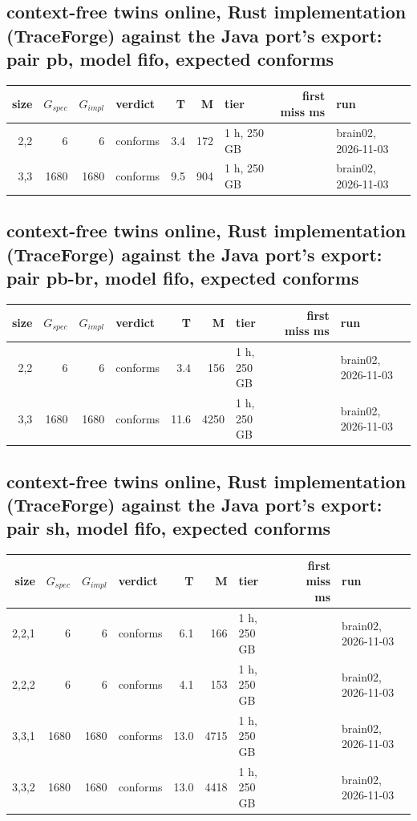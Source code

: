 \documentclass[10pt]{article}
\begin{document}
\subsection*{context-free twins online, Rust implementation (TraceForge) against the Java port's export: pair \textsf{pb}, model fifo, expected conforms}
\begin{longtable}{@{}rrrlrrlrl@{}}
\toprule
size & $G_{\mathit{spec}}$ & $G_{\mathit{impl}}$ & verdict & T & M & tier & first miss ms & run \\
\midrule
\endhead
\color{red} 2,2 & 6 & 6 & conforms & 3.4 & 172 & 1 h, 250 GB &  & brain02, 2026-11-03 \\
\color{red} 3,3 & 1680 & 1680 & conforms & 9.5 & 904 & 1 h, 250 GB &  & brain02, 2026-11-03 \\
\bottomrule
\end{longtable}
\subsection*{context-free twins online, Rust implementation (TraceForge) against the Java port's export: pair \textsf{pb-br}, model fifo, expected conforms}
\begin{longtable}{@{}rrrlrrlrl@{}}
\toprule
size & $G_{\mathit{spec}}$ & $G_{\mathit{impl}}$ & verdict & T & M & tier & first miss ms & run \\
\midrule
\endhead
\color{red} 2,2 & 6 & 6 & conforms & 3.4 & 156 & 1 h, 250 GB &  & brain02, 2026-11-03 \\
\color{red} 3,3 & 1680 & 1680 & conforms & 11.6 & 4250 & 1 h, 250 GB &  & brain02, 2026-11-03 \\
\bottomrule
\end{longtable}
\subsection*{context-free twins online, Rust implementation (TraceForge) against the Java port's export: pair \textsf{sh}, model fifo, expected conforms}
\begin{longtable}{@{}rrrlrrlrl@{}}
\toprule
size & $G_{\mathit{spec}}$ & $G_{\mathit{impl}}$ & verdict & T & M & tier & first miss ms & run \\
\midrule
\endhead
\color{red} 2,2,1 & 6 & 6 & conforms & 6.1 & 166 & 1 h, 250 GB &  & brain02, 2026-11-03 \\
\color{red} 2,2,2 & 6 & 6 & conforms & 4.1 & 153 & 1 h, 250 GB &  & brain02, 2026-11-03 \\
\color{red} 3,3,1 & 1680 & 1680 & conforms & 13.0 & 4715 & 1 h, 250 GB &  & brain02, 2026-11-03 \\
\color{red} 3,3,2 & 1680 & 1680 & conforms & 13.0 & 4418 & 1 h, 250 GB &  & brain02, 2026-11-03 \\
\bottomrule
\end{longtable}
\end{document}
